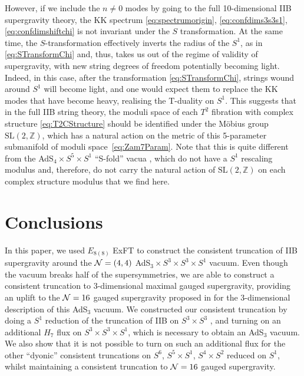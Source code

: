 \documentclass[a4paper, 11pt]{article}
\numberwithin{equation}{section}
\newcommand{\SL}[1]{\mathrm{SL}( #1 )}
\newcommand{\EE}{\ensuremath{E_{8(8)}}\xspace}
\newcommand{\+}{\oplus}
\begin{document}
However, if we include the $n \neq 0$ modes by going to the full 10-dimensional IIB supergravity theory, the KK spectrum \eqref{eq:spectrumorigin}, \eqref{eq:confdims3s3s1}, \eqref{eq:confdimshiftchi} is not invariant under the $S$ transformation. At the same time, the $S$-transformation effectively inverts the radius of the $S^1$, as in \eqref{eq:STransformChi} and, thus, takes us out of the regime of validity of supergravity, with new string degrees of freedom potentially becoming light. Indeed, in this case, after the transformation \eqref{eq:STransformChi}, strings wound around $S^1$ will become light, and one would expect them to replace the KK modes that have become heavy, realising the T-duality on $S^1$. This suggests that in the full IIB string theory, the moduli space of each $T^2$ fibration with complex structure \eqref{eq:T2CStructure} should be identified under the M\"{o}bius group $\SL{2,\mathbb{Z}}$, which has a natural action on the metric of this 5-parameter submanifold of moduli space~\eqref{eq:Zam7Param}. Note that this is quite different from the AdS$_4 \times S^5 \times S^1$ ``S-fold'' vacua \cite{Giambrone:2021zvp,Giambrone:2021wsm}, which do not have a $S^1$ rescaling modulus and, therefore, do not carry the natural action of $\SL{2,\mathbb{Z}}$ on each complex structure modulus that we find here.


\section{Conclusions} \label{s:Conclusions}
In this paper, we used $\EE$ ExFT to construct the consistent truncation of IIB supergravity around the ${\cal N}=(4,4)$ AdS$_3 \times S^3 \times S^3 \times S^1$ vacuum. Even though the vacuum breaks half of the supersymmetries, we are able to construct a consistent truncation to 3-dimensional maximal gauged supergravity, providing an uplift to the ${\cal N}=16$ gauged supergravity proposed in \cite{Hohm:2005ui} for the 3-dimensional description of this AdS$_3$ vacuum. We constructed our consistent truncation by doing a $S^1$ reduction of the truncation of IIB on $S^3 \times S^3$ \cite{Inverso:2016eet}, and turning on an additional $H_7$ flux on $S^3 \times S^3 \times S^1$, which is necessary to obtain an AdS$_3$ vacuum. We also show that it is not possible to turn on such an additional flux for the other ``dyonic'' consistent truncations on $S^6$, $S^5 \times S^1$, $S^4 \times S^2$ \cite{Guarino:2015jca,Inverso:2016eet} reduced on $S^1$, whilst maintaining a consistent truncation to ${\cal N}=16$ gauged supergravity.
\end{document}
